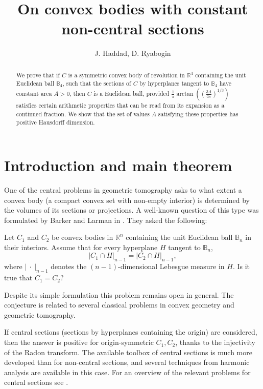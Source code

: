 \documentclass{amsart}
\title{On convex bodies with constant non-central sections}
\author{J. Haddad, D. Ryabogin}
\def \R{\mathbb R}
\def \B{\mathbb B}
\newcommand \vol[2][3]{\left|#2\right|_{#1}}
\begin{document}
\begin{abstract}
	We prove that if $C$ is a symmetric convex body of revolution in $\R^4$ containing the unit Euclidean ball $\B_4$, such that the sections of $C$ by hyperplanes tangent to $\B_4$ have constant area $A>0$, then $C$ is a Euclidean ball, provided $\frac 1{\pi} \arctan((\frac{3A}{4\pi})^{1/3})$ satisfies certain arithmetic properties that can be read from its expansion as a continued fraction.
	We show that the set of values $A$ satisfying these properties has positive Hausdorff dimension.
\end{abstract}

\maketitle

\section{Introduction and main theorem}

One of the central problems in geometric tomography asks to what extent a convex body (a compact convex set with non-empty interior) is determined by the volumes of its sections or projections. A well-known question of this type was formulated by Barker and Larman in \cite{barker2001}. They asked the following:

Let $C_1$ and $C_2$ be convex bodies in $\R^n$ containing the unit Euclidean ball $\B_n$ in their interiors. Assume that for every hyperplane $H$ tangent to $\B_n$,
\begin{equation}
	\label{eq_equalsections}
	\vol[n-1]{C_1 \cap H} = \vol[n-1]{C_2 \cap H},
\end{equation}
where $\vol[n-1]{\ \cdot \ }$ denotes the $(n-1)$-dimensional Lebesgue measure in $H$.
Is it true that $C_1=C_2$?

Despite its simple formulation this problem remains open in general.
The conjecture is related to several classical problems in convex geometry and geometric tomography.

If central sections (sections by hyperplanes containing the origin) are considered, then the answer is positive for origin-symmetric $C_1, C_2$, thanks to the injectivity of the Radon transform.
The available toolbox of central sections is much more developed than for non-central sections, and several techniques from harmonic analysis are available in this case.
For an overview of the relevant problems for central sections see \cite{koldobsky2005fourier, gardner2006geometric}.
\end{document}
